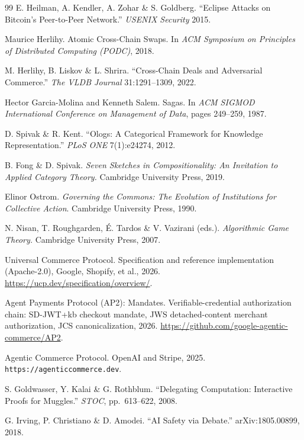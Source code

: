 \documentclass[11pt,a4paper]{article}
\theoremstyle{definition}
\theoremstyle{definition}
\theoremstyle{remark}
\begin{document}
\begin{thebibliography}{99}
 E. Heilman, A. Kendler, A. Zohar \& S. Goldberg. ``Eclipse
Attacks on Bitcoin's Peer-to-Peer Network.'' \emph{USENIX Security} 2015.

Maurice Herlihy.
\newblock Atomic Cross-Chain Swaps.
\newblock In \textit{ACM Symposium on Principles of Distributed Computing (PODC)}, 2018.

 M. Herlihy, B. Liskov \& L. Shrira. ``Cross-Chain Deals and
Adversarial Commerce.'' \emph{The VLDB Journal} 31:1291--1309, 2022.

 Hector Garcia-Molina and Kenneth Salem.
\newblock Sagas.
\newblock In \textit{ACM SIGMOD International Conference on Management of Data}, pages 249--259, 1987.

 D. Spivak \& R. Kent. ``Ologs: A Categorical Framework for
Knowledge Representation.'' \emph{PLoS ONE} 7(1):e24274, 2012.

 B. Fong \& D. Spivak. \emph{Seven Sketches in Compositionality:
An Invitation to Applied Category Theory.} Cambridge University Press, 2019.

 Elinor Ostrom.
\newblock \textit{Governing the Commons: The Evolution of Institutions for Collective Action}.
\newblock Cambridge University Press, 1990.

 N. Nisan, T. Roughgarden, É. Tardos \& V. Vazirani (eds.).
\emph{Algorithmic Game Theory.} Cambridge University Press, 2007.

 Universal Commerce Protocol.
\newblock Specification and reference implementation (Apache-2.0), Google, Shopify, et al., 2026.
\newblock \url{https://ucp.dev/specification/overview/}.

 Agent Payments Protocol (AP2): Mandates.
\newblock Verifiable-credential authorization chain: SD-JWT+kb checkout mandate, JWS detached-content merchant authorization, JCS canonicalization, 2026.
\newblock \url{https://github.com/google-agentic-commerce/AP2}.

 Agentic Commerce Protocol.
\newblock OpenAI and Stripe, 2025.
\newblock \texttt{https://agenticcommerce.dev}.

 S. Goldwasser, Y. Kalai \& G. Rothblum. ``Delegating
Computation: Interactive Proofs for Muggles.'' \emph{STOC}, pp.~613--622, 2008.

 G. Irving, P. Christiano \& D. Amodei. ``AI Safety via
Debate.'' arXiv:1805.00899, 2018.


\end{thebibliography}
\end{document}
